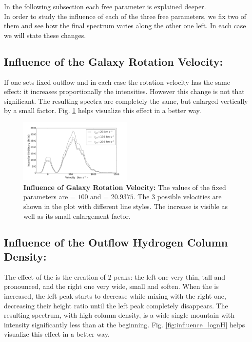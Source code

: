 \documentclass{latex/emulateapj}
\begin{document}
In the following subsection each free parameter is explained deeper. \\

In order to study the influence of each of the three free parameters, we fix two of them and see how the final spectrum varies along the other one left. In each case we will state these changes.\\

\subsection{Influence of the Galaxy Rotation Velocity: \vrot}

If one sets fixed outflow \vout and \lognh in each case the rotation velocity has the same effect: it increases proportionally the intensities. However this change is not that significant. The resulting spectra are completely the same, but enlarged vertically by a small factor. Fig. \ref{fig:influence_vrot} helps visualize this effect in a better way.\\

\begin{figure}[h!]
\begin{center}
	\includegraphics[width=0.5\textwidth]{./figures/inf_vgal_soft.png}
\end{center}
\caption{\textbf{Influence of Galaxy Rotation Velocity:} The values of the fixed parameters are \vout = $100$ \kms and \lognh = $20.9375$. The 3 possible velocities are shown in the plot with different line styles. The increase is visible as well as its small enlargement factor.\\
\label{fig:influence_vrot}}
\end{figure}

\subsection{Influence of the Outflow Hydrogen Column Density: \lognh }

The effect of the \lognh is the creation of 2 peaks: the left one very thin, tall and pronounced, and the right one very wide, small and soften. When the \lognh is increased, the left peak starts to decrease while mixing with the right one, decreasing their height ratio until the left peak completely disappears. The resulting spectrum, with high column density, is a wide single mountain with intensity significantly less than at the beginning. Fig. \ref{fig:influence_lognH} helps visualize this effect in a better way.\\
\end{document}
